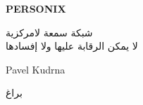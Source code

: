 \thispagestyle{empty}
\begin{center}
  {\sffamily\bfseries\fontsize{34}{40}\selectfont PERSONIX\par}
  \vspace{2.2em}
  {\rmfamily\large شبكة سمعة لامركزية\\[0.25em]
   لا يمكن الرقابة عليها ولا إفسادها\par}
\end{center}
\begin{center}
  {\rmfamily\Large Pavel Kudrna\par}
  \vspace{0.45em}
  {\rmfamily\small براغ\quad\textbullet{}\par}
\end{center}
\clearpage
